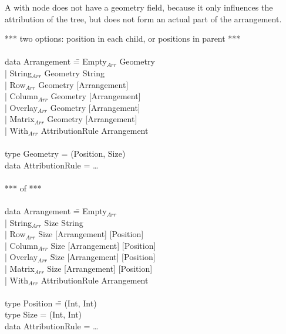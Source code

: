 A with node does not have a geometry field, because it only influences the attribution of the tree, but does not form an actual part of the arrangement. 
\ttfamily
\begin{tabbing}
*** two options: position in  each child, or positions in parent ***\\
\\
data Arrangement \= = Empty$_{Arr}$ Geometry\\
                 \> | String$_{Arr}$ Geometry String\\
                 \> | Row$_{Arr}$ Geometry [Arrangement]\\
                 \> | Column$_{Arr}$ Geometry [Arrangement]\\
                 \> | Overlay$_{Arr}$ Geometry [Arrangement]\\
                 \> | Matrix$_{Arr}$ Geometry [Arrangement]\\
                 \> | With$_{Arr}$ AttributionRule Arrangement\\
\\
type Geometry = (Position, Size)\\
data AttributionRule = \dots\\
\\
*** of ***\\
\\
data Arrangement \= = Empty$_{Arr}$\\
                 \> | String$_{Arr}$ Size String\\
                 \> | Row$_{Arr}$ Size [Arrangement] [Position]\\
                 \> | Column$_{Arr}$ Size [Arrangement] [Position]\\
                 \> | Overlay$_{Arr}$ Size [Arrangement] [Position]\\
                 \> | Matrix$_{Arr}$ Size [Arrangement] [Position]\\
                 \> | With$_{Arr}$ AttributionRule Arrangement\\
\\
type Position \= = (Int, Int)\\
type Size      \> = (Int, Int)\\
data AttributionRule = \dots\\
\end{tabbing}
\rmfamily


